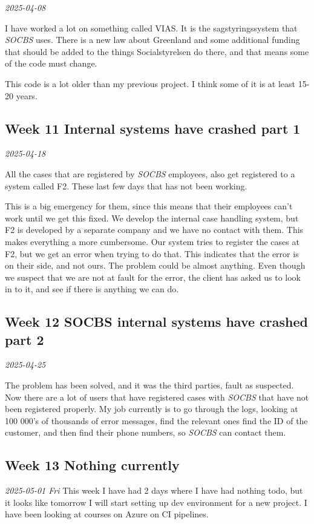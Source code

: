 \documentclass[../main.tex]{subfiles}
\begin{document}
\noindent \textit{2025-04-08}

I have worked a lot on something called VIAS. It is the sagstyringssystem that \textit{SOCBS} uses. There is a new law about Greenland and some additional funding that should be added to the things Socialstyrelsen do there, and that means some of the code must change.

This code is a lot older than my previous project. I think some of it is at least 15-20 years. 

\subsection{Week 11 Internal systems have crashed part 1}

\noindent \textit{2025-04-18}

All the cases that are registered by \textit{SOCBS} employees, also get registered to a system called F2. These last few days that has not been working. 

This is a big emergency for them, since this means that their employees can't work until we get this fixed.
We develop the internal case handling system, but F2 is developed by a separate company and we have no contact with them.
This makes everything a more cumbersome. Our system tries to register the cases at F2, but we get an error when trying to do that. 
This indicates that the error is on their side, and not ours. The problem could be almost anything.
Even though we suspect that we are not at fault for the error, the client has asked us to look in to it, and see if there is anything we can do.

\subsection{Week 12 SOCBS internal systems have crashed part 2}

\noindent \textit{2025-04-25}

The problem has been solved, and it was the third parties, fault as suspected. Now there are a lot of users that have registered cases with \textit{SOCBS} that have not been registered properly. 
My job currently is to go through the logs, looking at 100 000's of thousands of error messages, find the relevant ones find the ID of the customer, and then find their phone numbers, so \textit{SOCBS} can contact them.

\subsection{Week 13 Nothing currently}
\noindent \textit{2025-05-01 Fri}
This week I have had 2 days where I have had nothing todo, but it looks like tomorrow I will start setting up dev environment for a new project. I have been looking at courses on Azure on CI pipelines.
\end{document}
